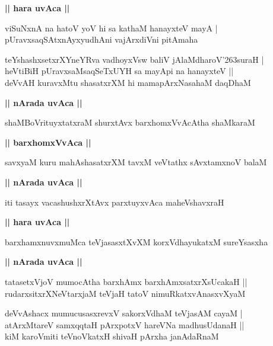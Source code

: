 \documentclass[twoside,12pt,openright]{book}
\def\S{\char'263}
\newcounter{shloka}[chapter]
\def\uvaca#1{\centerline{{\large\textbf{#1}}}}
\begin{document}
\uvaca{|| hara uvAca ||}

\begin{shloka}%
viSuNxnA na hatoV yoV hi sa kathaM hanayxteV mayA |\\
pUravxsaqSAtxnAyxyudhAni vajArxdiVni pitAmaha
\end{shloka}

\begin{shloka}%
teYshashxsetxrXYneYRva vadhoyxVsw baliV jAlaMdharoV\S suraH |\\
heVtiBiH pUravxsaMsaqSeTxUYH sa mayApi na hanayxteV ||\\
deVvAH kuravxMtu shasatxrXM hi mamapArxNasahaM daqDhaM 
\end{shloka}

\uvaca{|| nArada uvAca ||}

\begin{shloka}%
shaMBoVrituyxtatxraM shurxtAvx barxhomxVvAcAtha shaMkaraM
\end{shloka}

\uvaca{|| barxhomxVvAca ||}

\begin{shloka}%
savxyaM kuru mahAshasatxrXM tavxM veVtathx sAvxtamxnoV balaM 
\end{shloka}

\uvaca{|| nArada uvAca ||}

\begin{shloka}%
iti tasayx vacashushxrXtAvx parxtuyxvAca maheVshavxraH 
\end{shloka}

\uvaca{|| hara uvAca ||}

\begin{shloka}%
barxhamxnuvxmuMca teVjasasxtXvXM korxVdhayukatxM sureYsasxha 
\end{shloka}

\uvaca{|| nArada uvAca ||}

\begin{shloka}%
tatasetxVjoV mumocAtha barxhAmx barxhAmxsatxrXsUcakaH ||\\
rudarxsitxrXNeVtarxjaM teVjaH tatoV nimuRkatxvAnasxvXyaM 
\end{shloka}

\begin{shloka}%
deVvAshacx mumucusasxrevxV sakorxVdhaM teVjasAM cayaM |\\
atArxMtareV samxqqtaH pArxpotxV hareVNa madhusUdanaH ||\\
kiM karoVmiti teVnoVkatxH shivaH pArxha janAdaRnaM 
\end{shloka}
\end{document}
